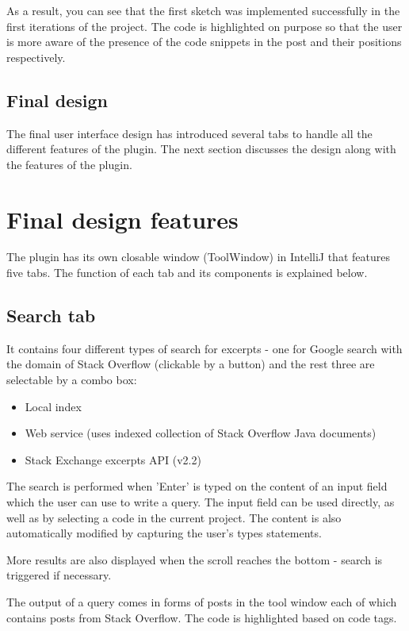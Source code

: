 \documentclass{l4proj}
\begin{document}
As a result, you can see that the first sketch was implemented successfully in the first iterations of the project. The code is highlighted on purpose so that the user is more aware of the presence of the code snippets in the post and their positions respectively.

\subsection{Final design}
The final user interface design has introduced several tabs to handle all the different features of the plugin. The next section discusses the design along with the features of the plugin.

\section{Final design features}
The plugin has its own closable window (ToolWindow) in IntelliJ that features five tabs. The function of each tab and its components is explained below.

\subsection{Search tab}
It contains four different types of search for excerpts - one for Google search with the domain of Stack Overflow (clickable by a button) and the rest three are selectable by a combo box:

\begin{itemize}
\item Local index
\item Web service (uses indexed collection of Stack Overflow Java documents)
\item Stack Exchange excerpts API (v2.2)
\end{itemize}

The search is performed when 'Enter' is typed on the content of an input field which the user can use to write a query. The input field can be used directly, as well as by selecting a code in the current project. The content is also automatically modified by capturing the user's types statements.

More results are also displayed when the scroll reaches the bottom - search is triggered if necessary.

The output of a query comes in forms of posts in the tool window each of
which contains posts from Stack Overflow. The code is highlighted based on code tags.
\end{document}
